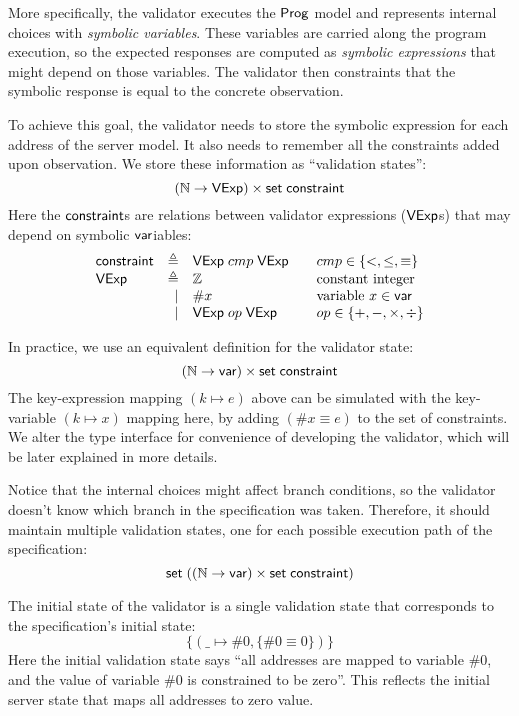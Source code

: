 More specifically, the validator executes the $\mathsf{Prog}$ model and represents
internal choices with {\em symbolic variables}.  These variables are carried
along the program execution, so the expected responses are computed as {\em
  symbolic expressions} that might depend on those variables.  The validator
then constraints that the symbolic response is equal to the concrete
observation.

To achieve this goal, the validator needs to store the symbolic expression for
each address of the server model.  It also needs to remember all the constraints
added upon observation.  We store these information as ``validation states'':
\[(\mathbb N\to\mathsf{VExp})\times\mathsf{set}\;\mathsf{constraint}\]
Here the $\mathsf{constraint}$s are relations between validator expressions ($\mathsf{VExp}$s)
that may depend on symbolic $\mathsf{var}$iables:
\[\begin{array}{lrl@{\qquad}l}
\constraint&\triangleq&\Vexp\;cmp\;\Vexp&cmp\in\{<,\le,\equiv\}\\
\Vexp&\triangleq&\Int&\text{constant integer}\\
&\mid&\#x&\text{variable }x\in\Var\\
&\mid&\Vexp\;op\;\Vexp&op\in\{+,-,\times,\div\}\\
\end{array}\]

In practice, we use an equivalent definition for the validator state:
\[(\mathbb N\to\mathsf{var})\times\mathsf{set}\;\mathsf{constraint}\]
The key-expression mapping $(k\mapsto e)$ above can be simulated with the
key-variable $(k\mapsto x)$ mapping here, by adding $(\#x\equiv e)$ to the set
of constraints.  We alter the type interface for convenience of developing the
validator, which will be later explained in more details.

Notice that the internal choices might affect branch conditions, so the
validator doesn't know which branch in the specification was taken.  Therefore,
it should maintain multiple validation states, one for each possible execution
path of the specification:
\[\mathsf{set}\;((\mathbb N\to\mathsf{var})\times\mathsf{set}\;\mathsf{constraint})\]

The initial state of the validator is a single validation state that corresponds
to the specification's initial state:
\[\{(\_\mapsto\#0,\{\#0\equiv0\})\}\]
Here the initial validation state says ``all addresses are mapped to variable
$\#0$, and the value of variable $\#0$ is constrained to be zero''.  This
reflects the initial server state that maps all addresses to zero value.

